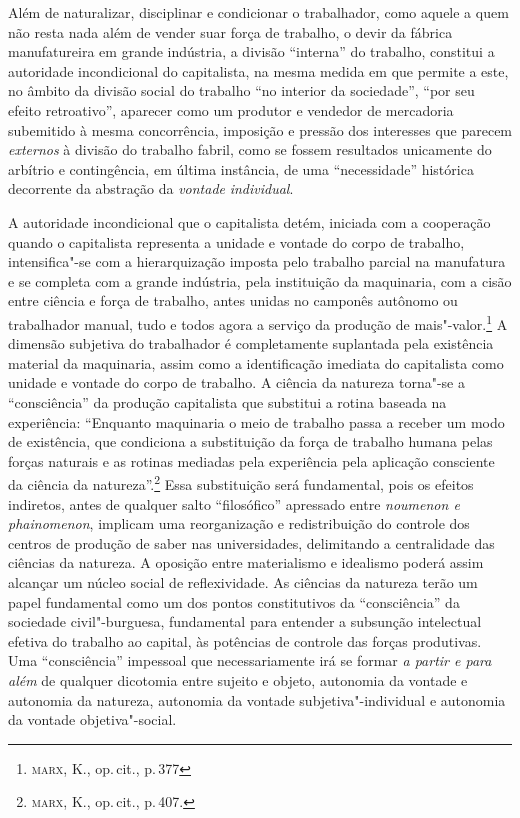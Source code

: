 Além de naturalizar, disciplinar e condicionar o trabalhador, como
aquele a quem não resta nada além de vender suar força de trabalho, o
devir da fábrica manufatureira em grande indústria, a divisão
``interna'' do trabalho, constitui a autoridade incondicional do
capitalista, na mesma medida em que permite a este, no âmbito da divisão
social do trabalho ``no interior da sociedade'', ``por seu efeito
retroativo'', aparecer como um produtor e vendedor de mercadoria
subemitido à mesma concorrência, imposição e pressão dos interesses que
parecem \emph{externos} à divisão do trabalho fabril, como se fossem
resultados unicamente do arbítrio e contingência, em última instância,
de uma ``necessidade'' histórica decorrente da abstração da
\emph{vontade} \emph{individual}.

A autoridade incondicional que o capitalista detém, iniciada com a
cooperação quando o capitalista representa a unidade e vontade do corpo
de trabalho, intensifica"-se com a hierarquização imposta pelo trabalho
parcial na manufatura e se completa com a grande indústria, pela
instituição da maquinaria, com a cisão entre ciência e força de
trabalho, antes unidas no camponês autônomo ou trabalhador manual, tudo
e todos agora a serviço da produção de mais"-valor.\footnote{\textsc{marx}, K., op.\,cit., p.\,377} A dimensão subjetiva do trabalhador é completamente suplantada
pela existência material da maquinaria, assim como a identificação
imediata do capitalista como unidade e vontade do corpo de trabalho. A
ciência da natureza torna"-se a ``consciência'' da produção capitalista
que substitui a rotina baseada na experiência: ``Enquanto maquinaria o
meio de trabalho passa a receber um modo de existência, que condiciona a
substituição da força de trabalho humana pelas forças naturais e as
rotinas mediadas pela experiência pela aplicação consciente da ciência
da natureza''.\footnote{\textsc{marx}, K., op.\,cit., p.\,407.} Essa substituição será fundamental, pois os efeitos
indiretos, antes de qualquer salto ``filosófico'' apressado entre
\emph{noumenon e phainomenon}, implicam uma reorganização e
redistribuição do controle dos centros de produção de saber nas
universidades, delimitando a centralidade das ciências da natureza. A
oposição entre materialismo e idealismo poderá assim alcançar um núcleo
social de reflexividade. As ciências da natureza terão um papel
fundamental como um dos pontos constitutivos da ``consciência'' da
sociedade civil"-burguesa, fundamental para entender a subsunção
intelectual efetiva do trabalho ao capital, às potências de controle das
forças produtivas. Uma ``consciência'' impessoal que necessariamente irá
se formar \emph{a partir e para além} de qualquer dicotomia entre
sujeito e objeto, autonomia da vontade e autonomia da natureza,
autonomia da vontade subjetiva"-individual e autonomia da vontade
objetiva"-social.

